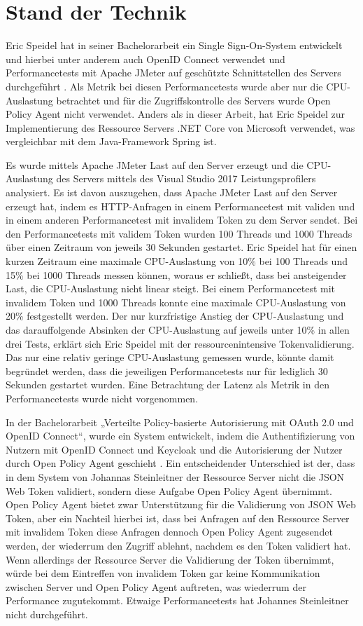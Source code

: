 \chapter{Stand der Technik}
\label{StandderTechnik}
Eric Speidel hat in seiner Bachelorarbeit ein Single Sign-On-System entwickelt und hierbei unter anderem auch OpenID Connect verwendet und Performancetests mit Apache JMeter auf geschützte Schnittstellen des Servers durchgeführt \citep{speidel:2017}. Als Metrik bei diesen Performancetests wurde aber nur die CPU-Auslastung betrachtet und für die Zugriffskontrolle des Servers wurde Open Policy Agent nicht verwendet. Anders als in dieser Arbeit, hat Eric Speidel zur Implementierung des Ressource Servers .NET Core von Microsoft verwendet, was vergleichbar mit dem Java-Framework Spring ist.\smallskip

Es wurde mittels Apache JMeter Last auf den Server erzeugt und die CPU-Auslastung des Servers mittels des Visual Studio 2017 Leistungsprofilers analysiert. Es ist davon auszugehen, dass Apache JMeter Last auf den Server erzeugt hat, indem es HTTP-Anfragen in einem Performancetest mit validen und in einem anderen Performancetest mit invalidem Token zu dem Server sendet. Bei den Performancetests mit validem Token wurden 100 Threads und 1000 Threads über einen Zeitraum von jeweils 30 Sekunden gestartet. Eric Speidel hat für einen kurzen Zeitraum eine maximale CPU-Auslastung von 10\% bei 100 Threads und 15\% bei 1000 Threads messen können, woraus er schließt, dass bei ansteigender Last, die CPU-Auslastung nicht linear steigt. Bei einem Performancetest mit invalidem Token und 1000 Threads konnte eine maximale CPU-Auslastung von 20\% festgestellt werden. Der nur kurzfristige Anstieg der CPU-Auslastung und das darauffolgende Absinken der CPU-Auslastung auf jeweils unter 10\% in allen drei Tests, erklärt sich Eric Speidel mit der ressourcenintensive Tokenvalidierung. Das nur eine relativ geringe CPU-Auslastung gemessen wurde, könnte damit begründet werden, dass die jeweiligen Performancetests nur für lediglich 30 Sekunden gestartet wurden. Eine Betrachtung der Latenz als Metrik in den Performancetests wurde nicht vorgenommen.\bigskip

In der Bachelorarbeit „Verteilte Policy-basierte Autorisierung mit OAuth 2.0 und OpenID Connect“, wurde ein System entwickelt, indem die Authentifizierung von Nutzern mit OpenID Connect und Keycloak und die Autorisierung der Nutzer durch Open Policy Agent geschieht \citep{steinleitner:2020}. Ein entscheidender Unterschied ist der, dass in dem System von Johannas Steinleitner der Ressource Server nicht die JSON Web Token validiert, sondern diese Aufgabe Open Policy Agent übernimmt. Open Policy Agent bietet zwar Unterstützung für die Validierung von JSON Web Token, aber ein Nachteil hierbei ist, dass bei Anfragen auf den Ressource Server mit invalidem Token diese Anfragen dennoch Open Policy Agent zugesendet werden, der wiederrum den Zugriff ablehnt, nachdem es den Token validiert hat. Wenn allerdings der Ressource Server die Validierung der Token übernimmt, würde bei dem Eintreffen von invalidem Token gar keine Kommunikation zwischen Server und Open Policy Agent auftreten, was wiederrum der Performance zugutekommt. Etwaige Performancetests hat Johannes Steinleitner nicht durchgeführt.\bigskip

